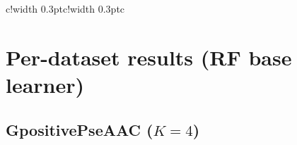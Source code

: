 \documentclass[11pt]{article}
\begin{document}
\begin{table}[!htbp]
\begin{tabular}{c!{\color{black!25}\vrule width 0.3pt}c!{\color{black!25}\vrule width 0.3pt}c}
\end{tabular}
\caption{(Table G7) Average scores (in \%, $y$-axis) over $5\times 5$ cross-validation folds, plotted against the classifiers ($x$-axis): partial-order predictors (PA-H-2, PA-H, PA-S-2, PA-S) and preorder predictors (PR-H-2, PR-H, PR-S-2, PR-S). Results are color-coded with respect to the noisy level $\alpha$ as follows: \textcolor[HTML]{fecc5c}{$\alpha = 0.0$}, \textcolor[HTML]{fd8d3c}{$\alpha = 0.1$}, \textcolor[HTML]{f03b20}{$\alpha = 0.2$} and \textcolor[HTML]{bd0026}{$\alpha = 0.3$}.}
\label{tab:paperapp_g7_rf_pa_g1}
\end{table}

\FloatBarrier

\clearpage

\section{Per-dataset results (RF base learner)}

\subsection{GpositivePseAAC ($K=4$)}
\end{document}
